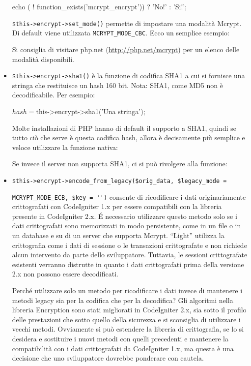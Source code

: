 \begin{itemize}
\begin{code}
echo ( ! function_exists('mcrypt_encrypt')) ? 'No!' : 'Si!';
\end{code}

\verb|$this->encrypt->set_mode()| permette di impostare una modalità Mcrypt. Di default viene utilizzata \verb|MCRYPT_MODE_CBC|. Ecco un semplice esempio:


Si consiglia di visitare php.net (\url{http://php.net/mcrypt}) per un elenco delle modalità disponibili.

\item \verb|$this->encrypt->sha1()| è la funzione di codifica SHA1 a cui si fornisce una stringa che restituisce un hash 160 bit. Nota: SHA1, come MD5 non è decodificabile. Per esempio:

\begin{code}
$hash = $this->encrypt->sha1('Una stringa');
\end{code}

Molte installazioni di \ac{PHP} hanno di default il supporto a SHA1, quindi se tutto ciò che serve è questa codifica hash, allora è decisamente più semplice e veloce utilizzare la funzione nativa:


Se invece il server non supporta SHA1, ci si può rivolgere alla funzione:

\item \verb|$this->encrypt->encode_from_legacy($orig_data, $legacy_mode = | 

\verb|MCRYPT_MODE_ECB, $key = '')| consente di ricodificare i dati originariamente crittografati con CodeIgniter 1.x per essere compatibili con la libreria presente in CodeIgniter 2.x. \'E necessario utilizzare questo metodo solo se i dati crittografati sono memorizzati in modo persistente, come in un file o in un database e su di un server che supporta Mcrypt. ``Light'' utilizza la crittografia come i dati di sessione o le transazioni crittografate e non richiede alcun intervento da parte dello sviluppatore. Tuttavia, le sessioni crittografate esistenti verranno distrutte in quanto i dati crittografati prima della versione 2.x non possono essere decodificati.

Perché utilizzare solo un metodo per ricodificare i dati invece di mantenere i metodi legacy sia per la codifica che per la decodifica? Gli algoritmi nella libreria Encryption sono stati migliorati in CodeIgniter 2.x, sia sotto il profilo delle prestazioni che sotto quello della sicurezza e si sconsiglia di utilizzare i vecchi metodi. Ovviamente si può estendere la libreria di crittografia, se lo si desidera e sostituire i nuovi metodi con quelli precedenti e mantenere la compatibilità con i dati crittografati da CodeIgniter 1.x, ma questa è una decisione che uno sviluppatore dovrebbe ponderare con cautela.


\end{itemize}
